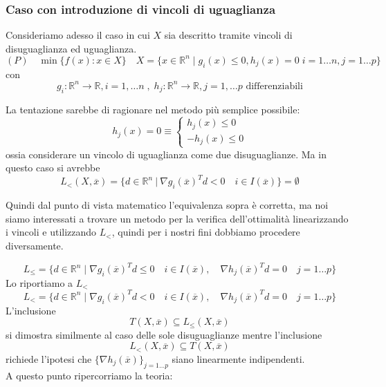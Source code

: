 \subsubsection{Caso con introduzione di vincoli di uguaglianza}
Consideriamo adesso il caso in cui $X$ sia descritto tramite
vincoli di disuguaglianza ed uguaglianza.
$$(P) \quad \min\{ f(x) : x \in X \} \quad
X = \{ x \in \mathbb{R}^{n} \; | \; g_i(x) \leq 0, h_j(x) = 0
\; i=1\ldots n, j =1 \ldots p
\}
$$
con
$$ g_i: \mathbb{R}^{n} \rightarrow \mathbb{R}, i=1, \ldots n \; , \;
h_j :  \mathbb{R}^{n} \rightarrow \mathbb{R}, j=1,\ldots p 
 \text{ differenziabili}
$$
\begin{notes}
La tentazione sarebbe di ragionare nel metodo pi\`u semplice possibile:
$$
 h_j(x) = 0 \equiv
\left\{
\begin{array}{l}
h_j(x) \leq 0 \\
- h_j(x) \leq 0
\end{array}
\right.
$$
ossia considerare un vincolo di uguaglianza come due disuguaglianze.
Ma in questo caso si avrebbe
$$
L_{<}(X, \overline{x}) = \{d \in \mathbb{R}^n ~|~ \nabla g_i(\overline{x})^Td <0 \quad i \in I(\overline{x})\} = \emptyset
$$

Quindi dal punto di vista matematico l'equivalenza sopra è corretta, ma noi siamo interessati a trovare un metodo per la verifica dell'ottimalità linearizzando i vincoli e utilizzando $L_<$, quindi per i nostri fini dobbiamo procedere diversamente.
\end{notes}

$$L_{\leq} =
\{ d \in \mathbb{R}^{n} \; | \; \nabla g_i(\overline{x})^{T} d \leq 0
\quad i \in I(\overline{x}),\quad \nabla h_j(\overline{x})^{T}d = 0
\quad j=1 \ldots p \}
$$
Lo riportiamo a $L_{<}$
$$L_{<} =
\{ d \in \mathbb{R}^{n} \; | \; \nabla g_i(\overline{x})^{T} d < 0
\quad i \in I(\overline{x}), \quad \nabla h_j(\overline{x})^{T}d = 0
\quad j=1 \ldots p \}
$$
L'inclusione 
$$T(X, \overline{x}) \subseteq L_{\leq}(X, \overline{x})$$
si dimostra similmente al caso delle sole disuguaglianze
mentre l'inclusione 
$$ L_{<}(X, \overline{x}) \subseteq T(X, \overline{x})$$
richiede l'ipotesi che $\{ \nabla h_j(\overline{x})\}_{j=1\ldots p}$
siano linearmente indipendenti. \\
A questo punto ripercorriamo la teoria:


